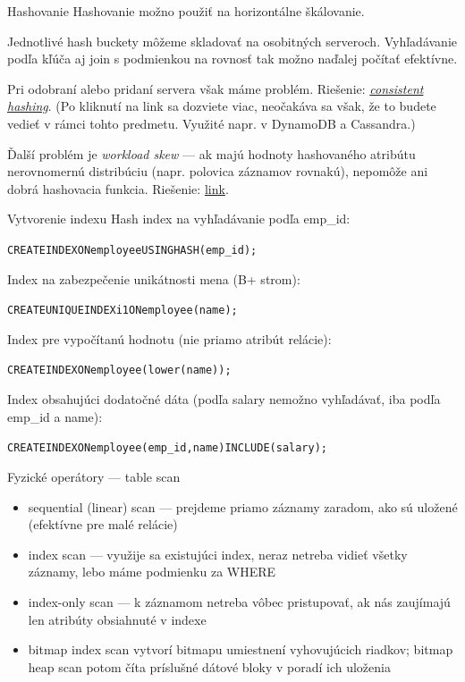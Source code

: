\documentclass[12pt]{beamer}
\def\blue#1{\textcolor{Cerulean}{#1}}
\begin{document}
\begin{frame}[fragile]{Hashovanie}
Hashovanie možno použiť na horizontálne škálovanie.
\bigskip

Jednotlivé hash buckety môžeme skladovať na osobitných serveroch.
Vyhľadávanie podľa kľúča aj join s podmienkou na rovnosť tak možno naďalej počítať efektívne.
\bigskip

Pri odobraní alebo pridaní servera však máme problém. Riešenie:
\blue{\href{https://medium.datadriveninvestor.com/consistent-hashing-an-efficient-scalable-data-distribution-algorithm-a81fc5c0a6c7}{\emph{consistent hashing}}}.
(Po kliknutí na link sa dozviete viac, neočakáva sa však, že to budete vedieť v rámci tohto predmetu. Využité napr. v DynamoDB a Cassandra.)

\bigskip
Ďalší problém je \emph{workload skew} --- ak majú hodnoty hashovaného atribútu nerovnomernú distribúciu (napr. polovica záznamov rovnakú),
nepomôže ani dobrá hashovacia funkcia. Riešenie:
\href{https://scalablehuman.com/2022/06/05/how-to-relieve-hotspots-with-skewed-workloads/}{link}.
\end{frame}


\begin{frame}[fragile]{Vytvorenie indexu}
Hash index na vyhľadávanie podľa emp\_id:
\begin{alltt}
  \blue{CREATE INDEX ON employee USING HASH (emp_id);}
\end{alltt}
Index na zabezpečenie unikátnosti mena (B+ strom):
\begin{alltt}
  \blue{CREATE UNIQUE INDEX i1 ON employee (name);}
\end{alltt}
Index pre vypočítanú hodnotu (nie priamo atribút relácie):
\begin{alltt}
  \blue{CREATE INDEX ON employee (lower(name));}
\end{alltt}
Index obsahujúci dodatočné dáta (podľa salary nemožno vyhľadávať, iba podľa emp\_id a name):
{\small
\begin{alltt}
  \blue{CREATE INDEX ON employee (emp_id, name) INCLUDE (salary);}
\end{alltt}
}
\end{frame}

\begin{frame}[fragile]{Fyzické operátory --- table scan}
\begin{itemize}
\item \alert{sequential (linear) scan} --- prejdeme priamo záznamy zaradom, ako sú uložené (efektívne pre malé relácie)
\item \alert{index scan} --- využije sa existujúci index, neraz netreba vidieť všetky záznamy, lebo máme podmienku za WHERE
\item \alert{index-only scan} --- k záznamom netreba vôbec pristupovať, ak nás zaujímajú len atribúty obsiahnuté v indexe
\item \alert{bitmap index scan} vytvorí bitmapu umiestnení vyhovujúcich riadkov;
\alert{bitmap heap scan} potom číta príslušné dátové bloky v poradí ich uloženia
\end{itemize}
\end{frame}
\end{document}
